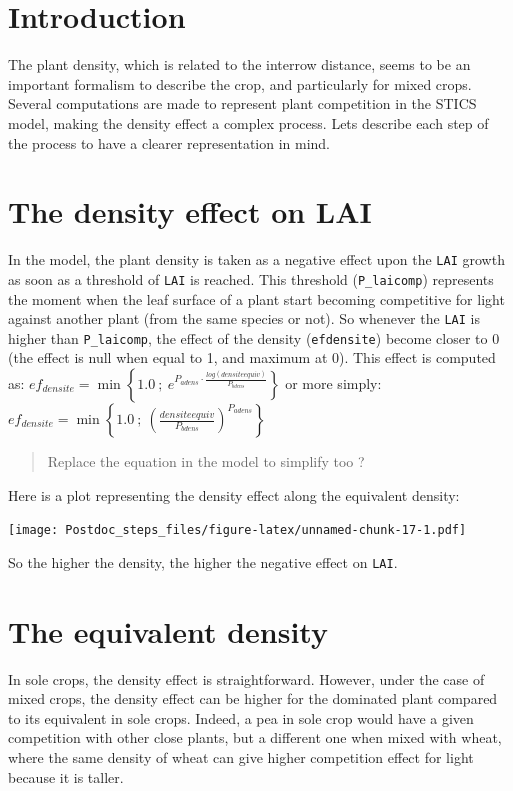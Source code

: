 \documentclass[]{book}
\theoremstyle{definition}
\theoremstyle{definition}
\theoremstyle{definition}
\theoremstyle{remark}
\begin{document}
\section{Introduction}\label{introduction-2}

The plant density, which is related to the interrow distance, seems to
be an important formalism to describe the crop, and particularly for
mixed crops. Several computations are made to represent plant
competition in the STICS model, making the density effect a complex
process. Lets describe each step of the process to have a clearer
representation in mind.

\section{The density effect on LAI}\label{the-density-effect-on-lai}

In the model, the plant density is taken as a negative effect upon the
\texttt{LAI} growth as soon as a threshold of \texttt{LAI} is reached.
This threshold (\texttt{P\_laicomp}) represents the moment when the leaf
surface of a plant start becoming competitive for light against another
plant (from the same species or not). So whenever the \texttt{LAI} is
higher than \texttt{P\_laicomp}, the effect of the density
(\texttt{efdensite}) become closer to 0 (the effect is null when equal
to 1, and maximum at 0). This effect is computed as:
\(ef_{densite}=\min\left\{1.0\ ;\ e^{P_{adens}\cdot\frac{log(densiteequiv)}{P_{bdens}}}\right\}\)
or more simply:
\(ef_{densite}=\min\left\{1.0\ ;\ (\frac{densiteequiv}{P_{bdens}})^{P_{adens}}\right\}\)

\begin{quote}
Replace the equation in the model to simplify too ?
\end{quote}

Here is a plot representing the density effect along the equivalent
density:

\texttt{[image: Postdoc\_steps\_files/figure-latex/unnamed-chunk-17-1.pdf]}

So the higher the density, the higher the negative effect on
\texttt{LAI}.

\section{The equivalent density}\label{the-equivalent-density}

In sole crops, the density effect is straightforward. However, under the
case of mixed crops, the density effect can be higher for the dominated
plant compared to its equivalent in sole crops. Indeed, a pea in sole
crop would have a given competition with other close plants, but a
different one when mixed with wheat, where the same density of wheat can
give higher competition effect for light because it is taller.
\end{document}
